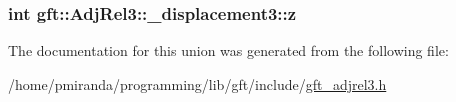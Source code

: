 \subsubsection[{\texorpdfstring{z}{z}}]{\setlength{\rightskip}{0pt plus 5cm}int gft\+::\+Adj\+Rel3\+::\+\_\+displacement3\+::z}\hypertarget{uniongft_1_1AdjRel3_1_1__displacement3_ac047739172cb413ef913e594f09170c3}{}\label{uniongft_1_1AdjRel3_1_1__displacement3_ac047739172cb413ef913e594f09170c3}


The documentation for this union was generated from the following file\+:\begin{DoxyCompactItemize}
\item 
/home/pmiranda/programming/lib/gft/include/\hyperlink{gft__adjrel3_8h}{gft\+\_\+adjrel3.\+h}\end{DoxyCompactItemize}
